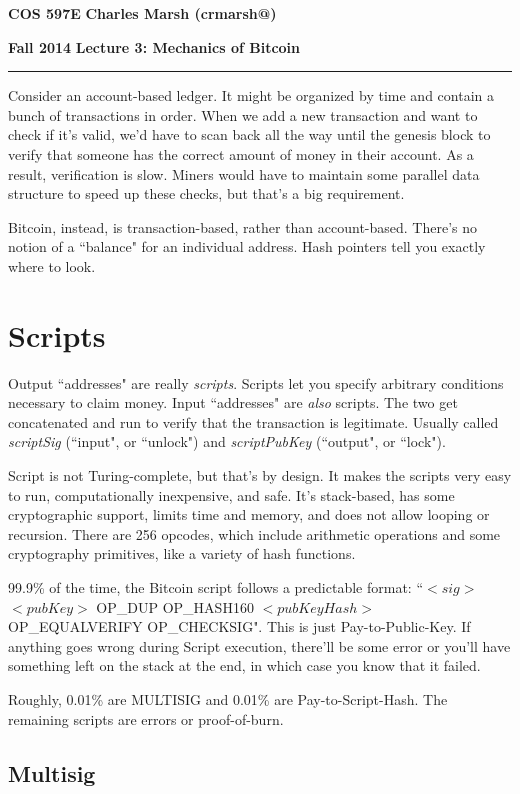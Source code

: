 \documentclass[12pt]{article}
\makeatletter
\newcommand{\myheader}[4]
{\vspace*{-0.5in}
\noindent
{#1} \hfill {#3}

\noindent
{#2} \hfill {#4}

\noindent
\rule[8pt]{\textwidth}{1pt}

\vspace{1ex} 
}  %
\newcommand{\myalgsheader}[0]
{\myheader
{ {\bf{COS 597E}} }
{ {\bf{Fall 2014}} }
{ {\bf{Charles Marsh (crmarsh@)}} }
{ {\bf{Lecture 3: Mechanics of Bitcoin}} }
}
\makeatother
\begin{document}
\myalgsheader

\pagestyle{plain}

Consider an account-based ledger. It might be organized by time and contain a bunch of transactions in order. When we add a new transaction and want to check if it's valid, we'd have to scan back all the way until the genesis block to verify that someone has the correct amount of money in their account. As a result, verification is slow. Miners would have to maintain some parallel data structure to speed up these checks, but that's a big requirement.

Bitcoin, instead, is transaction-based, rather than account-based. There's no notion of a ``balance" for an individual address. Hash pointers tell you exactly where to look.

\section*{Scripts}

Output ``addresses" are really \textit{scripts}. Scripts let you specify arbitrary conditions necessary to claim money. Input ``addresses" are \textit{also} scripts. The two get concatenated and run to verify that the transaction is legitimate. Usually called \textit{scriptSig} (``input", or ``unlock") and \textit{scriptPubKey} (``output", or ``lock").

Script is not Turing-complete, but that's by design. It makes the scripts very easy to run, computationally inexpensive, and safe. It's stack-based, has some cryptographic support, limits time and memory, and does not allow looping or recursion. There are 256 opcodes, which include arithmetic operations and some cryptography primitives, like a variety of hash functions.

99.9\% of the time, the Bitcoin script follows a predictable format: ``$<sig>$ $<pubKey>$ OP\_DUP OP\_HASH160 $<pubKeyHash>$ OP\_EQUALVERIFY OP\_CHECKSIG". This is just Pay-to-Public-Key. If anything goes wrong during Script execution, there'll be some error or you'll have something left on the stack at the end, in which case you know that it failed.

Roughly, 0.01\% are MULTISIG and 0.01\% are Pay-to-Script-Hash. The remaining scripts are errors or proof-of-burn.

\subsection*{Multisig}
\end{document}

